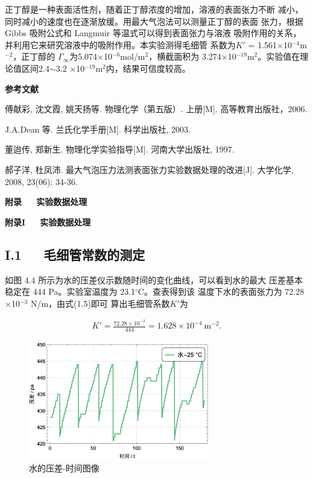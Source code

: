\documentclass[12pt]{ctexart}
\numberwithin{equation}{section}
\begin{document}
正丁醇是一种表面活性剂，随着正丁醇浓度的增加，溶液的表面张力不断
减小，同时减小的速度也在逐渐放缓。用最大气泡法可以测量正丁醇的表面
张力，根据 Gibbs 吸附公式和 Langmuir 等温式可以得到表面张力与溶液
吸附作用的关系，并利用它来研究溶液中的吸附作用。本实验测得毛细管
系数为$K′$ = 1.561$\times$10$^{-4}$m$^{-2}$，正丁醇的
$\Gamma_\infty$为5.074$\times$10$^{-6}$mol/m$^2$，横截面积为
3.274$\times$10$^{-19}$m$^2$。实验值在理论值区间2.4$\sim$3.2
$\times$10$^{-19}$m$^2$内，结果可信度较高。

\begin{center}
    \Large\bfseries{参考文献}
\end{center}
\noindent
[1] 傅献彩, 沈文霞, 姚天扬等. 物理化学（第五版）. 上册[M].
高等教育出版社，2006.

\noindent
[2] J.A.Dean 等. 兰氏化学手册[M]. 科学出版社, 2003.

\noindent
[3] 董迨传, 郑新生. 物理化学实验指导[M]. 河南大学出版社, 1997.

\noindent
[4] 郝子洋, 杜凤沛. 最大气泡压力法测表面张力实验数据处理的改进[J].
大学化学, 2008, 23(06): 34-36.

\newpage

\begin{center}
    \LARGE\bfseries{附录~~~实验数据处理}
\end{center}
\begin{center}
    \Large\bfseries{附录I~~~实验数据处理}
\end{center}

\subsection*{I.1~~~毛细管常数的测定}

如图 4.4 所示为水的压差仪示数随时间的变化曲线，可以看到水的最大
压差基本稳定在 444 Pa。实验室温度为 23.1$^\circ$C。查表得到该
温度下水的表面张力为 72.28$\times$10$^{-3}$ N/m，由式(1.5)即可
算出毛细管系数$K'$为

\begin{align}
    K' = \frac{72.28\times 10^{-3}}{444}
       = 1.628\times 10^{-4}~\mathrm{m^{-2}}.
    \tag{I.1}
\end{align}


\begin{figure}[ht]
    \centering
    \includegraphics[width=0.7\textwidth]{plot_water.jpg}
    \caption{水的压差-时间图像}
\end{figure}
\end{document}

